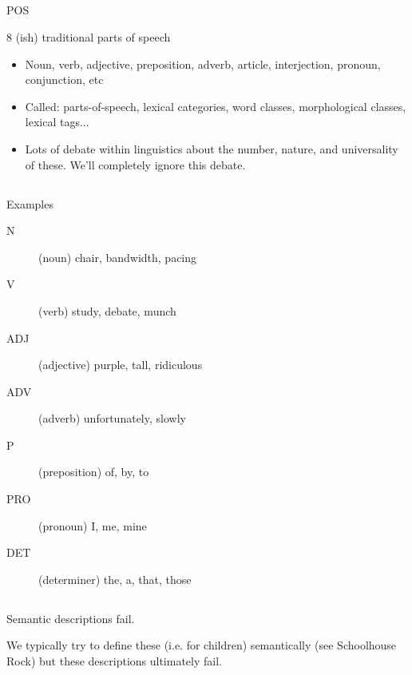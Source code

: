 \documentclass[9pt,xcolor=pdftex,dvipsnames,table]{beamer}
\begin{document}
\subsection{}
\begin{frame}{POS}

{\large 8 (ish) traditional parts of speech}
\vspace{.5cm}
\begin{itemize}
	\item Noun, verb, adjective, preposition, adverb, article, interjection, pronoun, conjunction, etc
	\item Called: parts-of-speech, lexical categories, word classes, morphological classes, lexical tags...
	\item Lots of debate within linguistics about the number, nature, and universality of these.  We'll completely ignore this debate.
\end{itemize}
\end{frame}

\subsection{}
\begin{frame}{Examples}
\begin{description}
	\item[N] (noun) chair, bandwidth, pacing
	\item[V] (verb) study, debate, munch
	\item[ADJ] (adjective) purple, tall, ridiculous
	\item[ADV] (adverb) unfortunately, slowly
	\item[P] (preposition) of, by, to
	\item[PRO] (pronoun) I, me, mine
	\item[DET] (determiner) the, a, that, those
\end{description}
\end{frame}

\subsection{}
\begin{frame}{Semantic descriptions fail.}

	\begin{center}
		{We typically try to define these (i.e. for children) semantically (see Schoolhouse Rock) but these descriptions ultimately fail.}
	\end{center}
\end{frame}
\end{document}
